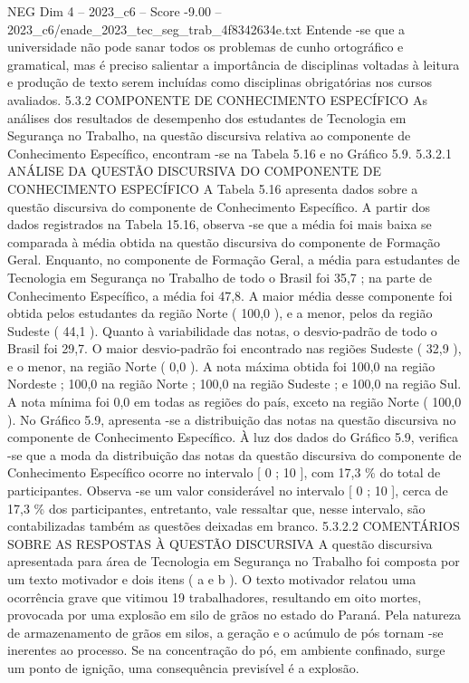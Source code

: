 \begin{textsample}{NEG Dim 4 – 2023\_c6 – Score -9.00 – 2023\_c6/enade\_2023\_tec\_seg\_trab\_4f8342634e.txt}
Entende -se que a universidade não pode sanar todos os problemas de cunho ortográfico e gramatical, mas é preciso salientar a importância de disciplinas voltadas à leitura e produção de texto serem incluídas como disciplinas obrigatórias nos cursos avaliados. 5.3.2 COMPONENTE DE CONHECIMENTO ESPECÍFICO As análises dos resultados de desempenho dos estudantes de Tecnologia em Segurança no Trabalho, na questão discursiva relativa ao componente de Conhecimento Específico, encontram -se na Tabela 5.16 e no Gráfico 5.9. 5.3.2.1 ANÁLISE DA QUESTÃO DISCURSIVA DO COMPONENTE DE CONHECIMENTO ESPECÍFICO A Tabela 5.16 apresenta dados sobre a questão discursiva do componente de Conhecimento Específico.
A partir dos dados registrados na Tabela 15.16, observa -se que a média foi mais baixa se comparada à média obtida na questão discursiva do componente de Formação Geral.
Enquanto, no componente de Formação Geral, a média para estudantes de Tecnologia em Segurança no Trabalho de todo o Brasil foi 35,7 ; na parte de Conhecimento Específico, a média foi 47,8.
A maior média desse componente foi obtida pelos estudantes da região Norte ( 100,0 ), e a menor, pelos da região Sudeste ( 44,1 ).
Quanto à variabilidade das notas, o desvio-padrão de todo o Brasil foi 29,7.
O maior desvio-padrão foi encontrado nas regiões Sudeste ( 32,9 ), e o menor, na região Norte ( 0,0 ).
A nota máxima obtida foi 100,0 na região Nordeste ; 100,0 na região Norte ; 100,0 na região Sudeste ; e 100,0 na região Sul.
A nota mínima foi 0,0 em todas as regiões do país, exceto na região Norte ( 100,0 ).
No Gráfico 5.9, apresenta -se a distribuição das notas na questão discursiva no componente de Conhecimento Específico.
À luz dos dados do Gráfico 5.9, verifica -se que a moda da distribuição das notas da questão discursiva do componente de Conhecimento Específico ocorre no intervalo [ 0 ; 10 ], com 17,3 \% do total de participantes.
Observa -se um valor considerável no intervalo [ 0 ; 10 ], cerca de 17,3 \% dos participantes, entretanto, vale ressaltar que, nesse intervalo, são contabilizadas também as questões deixadas em branco. 5.3.2.2 COMENTÁRIOS SOBRE AS RESPOSTAS À QUESTÃO DISCURSIVA A questão discursiva apresentada para área de Tecnologia em Segurança no Trabalho foi composta por um texto motivador e dois itens ( a e b ).
O texto motivador relatou uma ocorrência grave que vitimou 19 trabalhadores, resultando em oito mortes, provocada por uma explosão em silo de grãos no estado do Paraná.
Pela natureza de armazenamento de grãos em silos, a geração e o acúmulo de pós tornam -se inerentes ao processo.
Se na concentração do pó, em ambiente confinado, surge um ponto de ignição, uma consequência previsível é a explosão.

\end{textsample}
